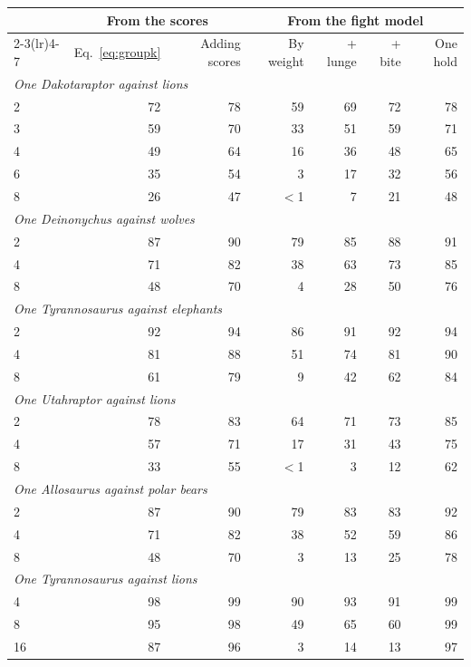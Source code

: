 \documentclass[11pt]{article}
\begin{document}
\begin{table}[t]
\centering
\footnotesize
\setlength{\tabcolsep}{5pt}
\begin{tabular}{lrrrrrr}
\toprule
& \multicolumn{2}{c}{From the scores} & \multicolumn{4}{c}{From the fight model} \\
\cmidrule(lr){2-3}\cmidrule(lr){4-7}
& Eq.~\eqref{eq:groupk} & Adding scores & By weight & + lunge & + bite & One hold \\
\midrule
\multicolumn{7}{l}{\textit{One Dakotaraptor against lions}} \\
2 & 72 & 78 & 59 & 69 & 72 & 78 \\
3 & 59 & 70 & 33 & 51 & 59 & 71 \\
4 & 49 & 64 & 16 & 36 & 48 & 65 \\
6 & 35 & 54 & 3 & 17 & 32 & 56 \\
8 & 26 & 47 & $<$1 & 7 & 21 & 48 \\
\multicolumn{7}{l}{\textit{One Deinonychus against wolves}} \\
2 & 87 & 90 & 79 & 85 & 88 & 91 \\
4 & 71 & 82 & 38 & 63 & 73 & 85 \\
8 & 48 & 70 & 4 & 28 & 50 & 76 \\
\multicolumn{7}{l}{\textit{One Tyrannosaurus against elephants}} \\
2 & 92 & 94 & 86 & 91 & 92 & 94 \\
4 & 81 & 88 & 51 & 74 & 81 & 90 \\
8 & 61 & 79 & 9 & 42 & 62 & 84 \\
\multicolumn{7}{l}{\textit{One Utahraptor against lions}} \\
2 & 78 & 83 & 64 & 71 & 73 & 85 \\
4 & 57 & 71 & 17 & 31 & 43 & 75 \\
8 & 33 & 55 & $<$1 & 3 & 12 & 62 \\
\multicolumn{7}{l}{\textit{One Allosaurus against polar bears}} \\
2 & 87 & 90 & 79 & 83 & 83 & 92 \\
4 & 71 & 82 & 38 & 52 & 59 & 86 \\
8 & 48 & 70 & 3 & 13 & 25 & 78 \\
\multicolumn{7}{l}{\textit{One Tyrannosaurus against lions}} \\
4 & 98 & 99 & 90 & 93 & 91 & 99 \\
8 & 95 & 98 & 49 & 65 & 60 & 99 \\
16 & 87 & 96 & 3 & 14 & 13 & 97 \\

\end{tabular}
\end{table}
\end{document}

